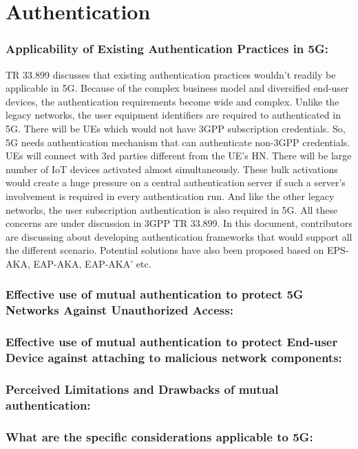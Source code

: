 \documentclass[lnicst,sechang,a4paper]{svmultln}
\begin{document}
\section{Authentication}
\label{sec:authentication}

\subsubsection{Applicability of Existing Authentication Practices in 5G:}
TR 33.899 discusses that existing authentication practices wouldn't readily be applicable in 5G. Because of the complex business model and diversified end-user devices, the authentication requirements become wide and complex. Unlike the legacy networks, the user equipment identifiers are required to authenticated in 5G. There will be UEs which would not have 3GPP subscription credentials. So, 5G needs authentication mechanism that can authenticate non-3GPP credentials. UEs will connect with 3rd parties different from the UE's HN. There will be large number of IoT devices activated almost simultaneously. These bulk activations would create a huge pressure on a central authentication server if such a server's involvement is required in every authentication run. And like the other legacy networks, the user subscription authentication is also required in 5G. All these concerns are under discussion in 3GPP TR 33.899. In this document, contributors are discussing about developing authentication frameworks that would support all the different scenario. Potential solutions have also been proposed based on EPS-AKA, EAP-AKA, EAP-AKA' etc.
\subsubsection{Effective use of mutual authentication to protect 5G Networks Against Unauthorized Access:}
\subsubsection{Effective use of mutual authentication to protect End-user Device against attaching to malicious network components:}
\subsubsection{Perceived Limitations and Drawbacks of mutual authentication:}
\subsubsection{What are the specific considerations applicable to 5G:}
\end{document}
